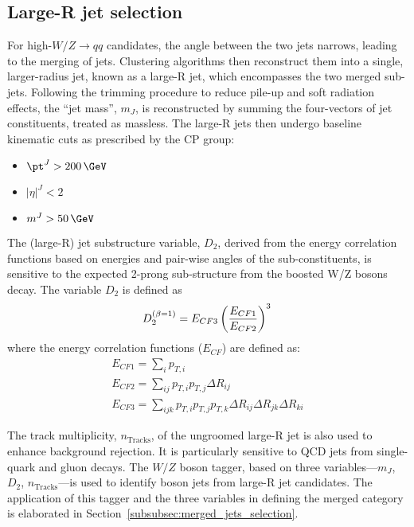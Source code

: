 \clearpage
\subsection{Large-R jet selection}
\label{subsec:large-Rjet}
For high-\pt $W/Z \to qq$ candidates, the angle between the two jets narrows, leading to the merging of jets. Clustering algorithms then reconstruct them into a single, larger-radius jet, known as a large-R jet, which encompasses the two merged sub-jets.
Following the trimming procedure\cite{Krohn:2009th} to reduce pile-up and soft radiation effects, the ``jet mass'', $m_J$, 
is reconstructed by summing the four-vectors of jet constituents, treated as massless. The large-R jets then undergo baseline kinematic cuts as prescribed by the CP group:

        \begin{itemize}
                \item $\pt^{J} > 200 \, \GeV$
                \item $|\eta|^{J} < 2$
                \item $m^{J} > 50 \, \GeV$
        \end{itemize}

The (large-R) jet substructure variable, $D_{2}$, derived from the energy correlation functions based on energies and pair-wise angles of the sub-constituents\cite{Larkoski:2014gra,Larkoski:2015kga}, is sensitive to the expected 2-prong sub-structure from the boosted W/Z bosons decay. The variable $D_{2}$ is defined as
\begin{equation}
D^{(\beta=1)}_2 = E_{CF3} \left( \frac{E_{CF1}}{E_{CF2}} \right)^3 \\
\end{equation}
where the energy correlation functions ($E_{CF}$) are defined as:
\begin{equation}
\begin{split}
E_{CF1} = \sum_{i} p_{T,i}
\\
E_{CF2} = \sum_{ij} p_{T,i}p_{T,j} \Delta R_{ij}
\\
E_{CF3} = \sum_{ijk} p_{T,i}p_{T,j}p_{T,k} \Delta R_{ij} \Delta R_{jk} \Delta R_{ki}
\end{split}
\end{equation}

The track multiplicity, $n_{\text{Tracks}}$, of the ungroomed large-R jet is also used to enhance background rejection. It is particularly sensitive to QCD jets from single-quark and gluon decays. 
The $W/Z$ boson tagger, based on three variables—$m_J$, $D_{2}$, $n_{\text{Tracks}}$—is used to identify boson jets from large-R jet candidates. The application of this tagger and the three variables in defining the merged category is elaborated in Section~\ref{subsubsec:merged_jets_selection}.

